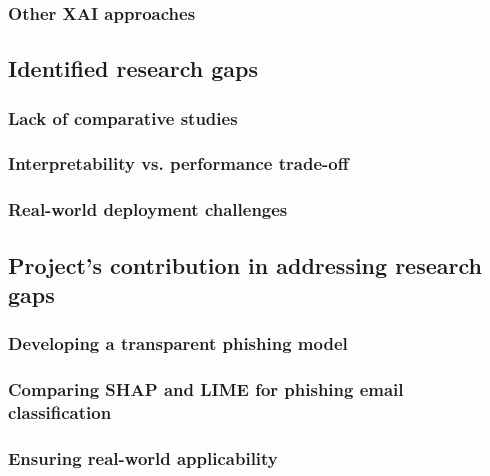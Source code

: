 \subsubsection*{Other XAI approaches}

\newpage

\subsection*{Identified research gaps}

\subsubsection*{Lack of comparative studies}

\subsubsection*{Interpretability vs. performance trade-off}

\subsubsection*{Real-world deployment challenges}

\newpage

\subsection*{Project's contribution in addressing research gaps}

\subsubsection*{Developing a transparent phishing model}

\subsubsection*{Comparing SHAP and LIME for phishing email classification}

\subsubsection*{Ensuring real-world applicability}
